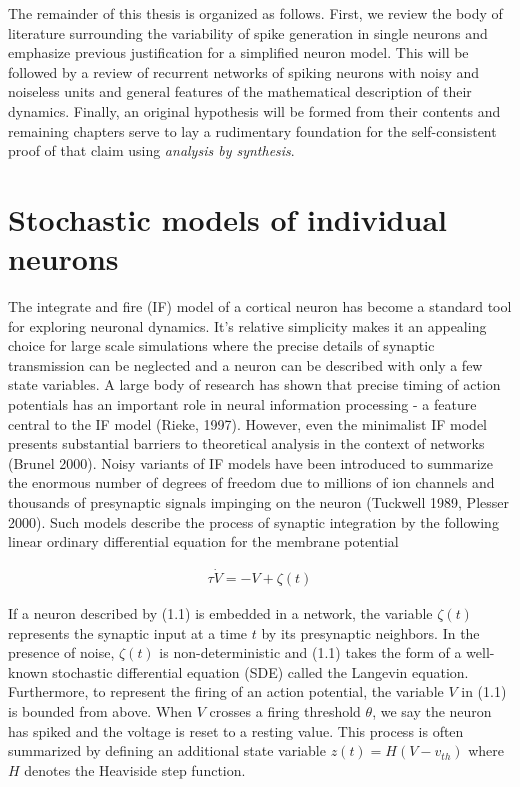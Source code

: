 \documentclass{ucetd}
\begin{document}
The remainder of this thesis is organized as follows. First, we review the body of literature surrounding the variability of spike generation in single neurons and emphasize previous justification for a simplified neuron model. This will be followed by a review of recurrent networks of spiking neurons with noisy and noiseless units and general features of the mathematical description of their dynamics. Finally, an original hypothesis will be formed from their contents and remaining chapters serve to lay a rudimentary foundation for the self-consistent proof of that claim using \emph{analysis by synthesis}.

\section{Stochastic models of individual neurons}

The integrate and fire (IF) model of a cortical neuron has become a standard tool for exploring neuronal dynamics. It's relative simplicity makes it an appealing choice for large scale simulations where the precise details of synaptic transmission can be neglected and a neuron can be described with only a few state variables. A large body of research has shown that precise timing of action potentials has an important role in neural information processing - a feature central to the IF model (Rieke, 1997). However, even the minimalist IF model presents substantial barriers to theoretical analysis in the context of networks (Brunel 2000). Noisy variants of IF models have been introduced to summarize the enormous number of degrees of freedom due to millions of ion channels and thousands of presynaptic signals impinging on the neuron (Tuckwell 1989, Plesser 2000). Such models describe the process of synaptic integration by the following linear ordinary differential equation for the membrane potential

\begin{align}
\tau\dot{V} = -V + \zeta(t)
\end{align}

If a neuron described by (1.1) is embedded in a network, the variable $\zeta(t)$ represents the synaptic input at a time $t$ by its presynaptic neighbors. In the presence of noise, $\zeta(t)$ is non-deterministic and (1.1) takes the form of a well-known stochastic differential equation (SDE) called the Langevin equation. Furthermore, to represent the firing of an action potential, the variable $V$ in (1.1) is bounded from above. When $V$ crosses a firing threshold $\theta$, we say the neuron has spiked and the voltage is reset to a resting value. This process is often summarized by defining an additional state variable $z(t) = H(V-v_{th})$ where $H$ denotes the Heaviside step function.
\end{document}
